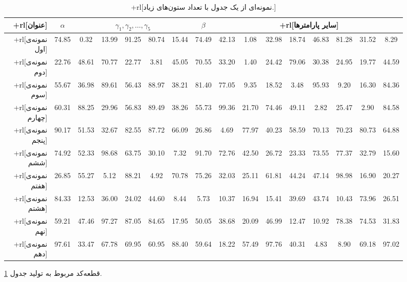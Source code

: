 		\begin{figure}
			\centering
		\footnotesize
		\begin{myverbatim}
\begin{landscape}
  \begin{table}
    \caption{+rl[نمونه‌ای از یک جدول با تعداد ستون‌های زیاد.]}
    \label{tbl1}
    \centering
    \footnotesize
    \begin{tabular}{|r||c|c|c|c|c|c|c|c|c|c|c|c|c|c|c|}
      \hline
      \textbf{+rl[عنوان]} & $\alpha$ 
        & \multicolumn{5}{|c|}{$\gamma_1, \gamma_2, \ldots, \gamma_5$} 
        & $\beta$ & \multicolumn{8}{|c|}{+rl[سایر پارامترها]} \\ \hline
      +rl[نمونه‌ی اول]   &   74.85 &  0.32 &  13.99 &  91.25 &  80.74
         &  15.44 &  74.49 &  42.13 &
        1.08  &  32.98 &  18.74 &  46.83 &  81.28 &  31.52 &  8.29 \\
      +rl[نمونه‌ی دوم] &   22.76 &  48.61 &  
        70.77 &  22.77 &  3.81 &  45.05 &  
        70.55 &  33.20 &  1.40  &  24.42 &  79.06 &  
          30.38 &  24.95 &  19.77 &  44.59 \\
      +rl[نمونه‌ی سوم] &   55.67 &  36.98 &
          89.61 &  56.43 &  88.97 &  38.21 &  
        81.40 &  77.05 &  9.35 &  18.52 &  3.48 &  
          95.93 &  9.20 &  16.30 &  84.36 \\
      +rl[نمونه‌ی چهارم] &   60.31 &  88.25 &
          29.96 &  56.83 &  89.49 &  38.26 &  
        55.73 &  99.36 &  21.70 &  74.46 &  49.11 &  2.82
           &  25.47 &  2.90 &  84.58 \\
      +rl[نمونه‌ی پنجم] &   90.17 &  51.53 
        &  32.67 &  82.55 &  87.72 &  66.09 &  26.86 &  
        4.69 &  77.97 &  40.23 &  58.59 &  70.13 &  70.23 &
            80.73 &  64.88 \\
      +rl[نمونه‌ی ششم] &   74.92 
        &  52.33 &  98.68 &  63.75 &  30.10 &  7.32 &  91.70 &  
        72.76 &  42.50 &  26.72 &  23.33 &  73.55 & 
           77.37 &  32.79 &  15.60 \\
      +rl[نمونه‌ی هفتم] &   26.85 &  55.27
         &  5.12 &  88.21 &  4.92 &  70.78 &  
        75.26 &  32.03 &  25.11 &  61.81 &  44.24 &
            47.14 &  98.98 &  16.90 &  20.27 \\
      +rl[نمونه‌ی هشتم] &   84.33 &  12.53 &  36.00
         &  24.02 &  44.60 &  8.44 &  
        5.73 &  10.37 &  16.94 &  15.41 &  39.69 &
            43.74 &  10.43 &  73.96 &  26.51 \\
      +rl[نمونه‌ی نهم] &   59.21 &  47.46 & 
           97.27 &  87.05 &  84.65 &  17.95 &  50.05 &  
        38.68 &  20.09 &  46.99 &  12.47 &  10.92 & 
           78.38 &  74.53 &  31.83 \\
      +rl[نمونه‌ی دهم] &   97.61 &  33.47 &  67.78 
        &  69.95 &  60.95 &  88.40 &  
        59.64 &  18.22 &  57.49 &  97.76 &  40.31 &
            4.83 &  8.90 &  69.18 &  97.02 \\ \hline
    \end{tabular}
  \end{table}
\end{landscape}
		\end{myverbatim}
		\caption{قطعه‌کد مربوط به تولید جدول \ref{tbl1}.}
		\label{fig:tbl1}
		\end{figure}
	
